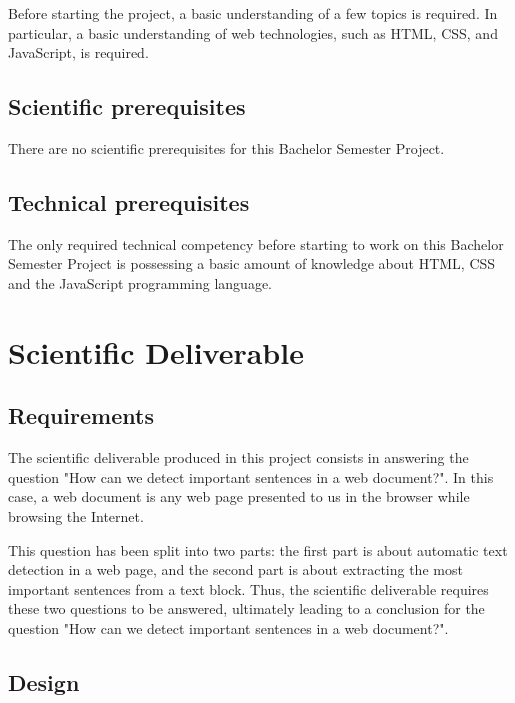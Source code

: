 \documentclass[conference,compsoc]{IEEEtran}
\begin{document}

Before starting the project, a basic understanding of a few topics is required. In particular, a basic understanding of web technologies, such as HTML, CSS, and JavaScript, is required.

\subsection{Scientific prerequisites}

There are no scientific prerequisites for this Bachelor
Semester Project.

\subsection{Technical prerequisites}

The only required technical competency before starting
to work on this Bachelor Semester Project is possessing
a basic amount of knowledge about HTML, CSS and the JavaScript programming language. 

\section{Scientific Deliverable}
\label{sec-sci-production}
\subsection{Requirements}


The scientific deliverable produced in this project consists in answering the question "How can we detect important sentences in a web document?". In this case, a web document is any web page presented to us in the browser while browsing the Internet.

This question has been split into two parts: the first part is about automatic text detection in a web page, and the second part is about extracting the most important sentences from a text block.
Thus, the scientific deliverable requires these two questions to be answered, ultimately leading to a conclusion for the question "How can we detect important sentences in a web document?".


\subsection{Design}
\end{document}
